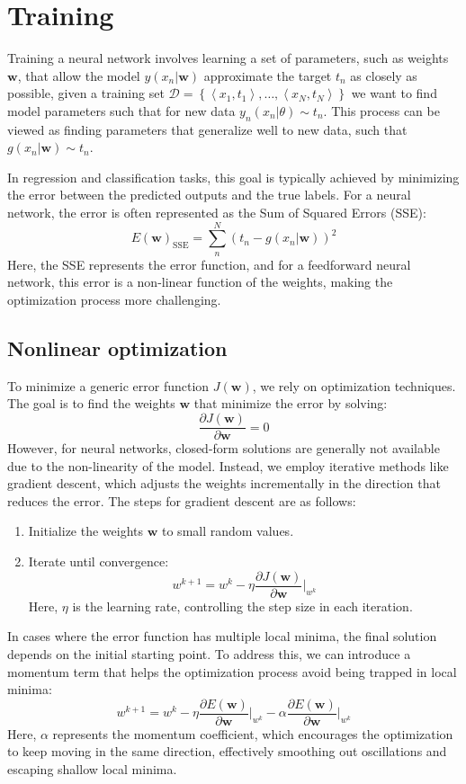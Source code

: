 \section{Training}

Training a neural network involves learning a set of parameters, such as weights $\mathbf{w}$, that allow the model $y(x_n|\mathbf{w})$ approximate the target $t_n$ as closely as possible, given a training set $\mathcal{D}=\left\{\left\langle x_1,t_1 \right\rangle,\dots,\left\langle x_N,t_N\right\rangle\right\}$ we want to find model parameters such that for new data $y_n(x_n|\theta)\sim t_n$.
This process can be viewed as finding parameters that generalize well to new data, such that $g(x_n|\mathbf{w})\sim t_n$. 

In regression and classification tasks, this goal is typically achieved by minimizing the error between the predicted outputs and the true labels. 
For a neural network, the error is often represented as the Sum of Squared Errors (SSE):
\[E(\mathbf{w})_{\text{SSE}}=\sum_n^N\left(t_n-g(x_n|\mathbf{w})\right)^2\]
Here, the SSE represents the error function, and for a feedforward neural network, this error is a non-linear function of the weights, making the optimization process more challenging.

\subsection{Nonlinear optimization}
To minimize a generic error function $J(\mathbf{w})$, we rely on optimization techniques.
The goal is to find the weights $\mathbf{w}$ that minimize the error by solving:
\[\dfrac{\partial J(\mathbf{w})}{\partial \mathbf{w}}=0\]
However, for neural networks, closed-form solutions are generally not available due to the non-linearity of the model. 
Instead, we employ iterative methods like gradient descent, which adjusts the weights incrementally in the direction that reduces the error.
The steps for gradient descent are as follows:
\begin{enumerate}
    \item Initialize the weights $\mathbf{w}$ to small random values.
    \item Iterate until convergence: 
        \[w^{k+1}=w^k-\eta\dfrac{\partial J(\mathbf{w})}{\partial \mathbf{w}}\Bigg|_{w^k}\]
        Here, $\eta$ is the learning rate, controlling the step size in each iteration. 
\end{enumerate}
In cases where the error function has multiple local minima, the final solution depends on the initial starting point. 
To address this, we can introduce a momentum term that helps the optimization process avoid being trapped in local minima:
\[w^{k+1}=w^k-\eta\dfrac{\partial E(\mathbf{w})}{\partial \mathbf{w}}\Bigg|_{w^k}-\alpha\dfrac{\partial E(\mathbf{w})}{\partial \mathbf{w}}\Bigg|_{w^k}\]
Here, $\alpha$ represents the momentum coefficient, which encourages the optimization to keep moving in the same direction, effectively smoothing out oscillations and escaping shallow local minima.

